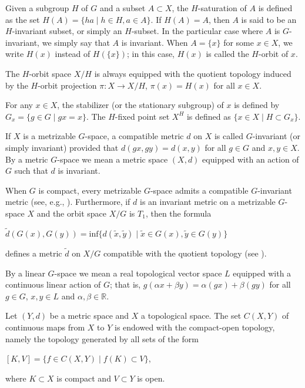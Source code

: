 \documentclass[12pt]{amsart}
\theoremstyle{definition}
\begin{document}
	Given a subgroup $H$ of $G$ and a subset $A\subset X$, the $H$-saturation of $A$ is defined as the set $H(A)= \{ha \mid h \in H, a \in A\}$. If $H(A)=A$, then $A$ is said to be an $H$-invariant subset, or simply an $H$-subset. In the particular case where $A$ is $G$-invariant, we simply say that $A$ is invariant. When $A=\{x\}$ for some $x\in X$, we write $H(x)$ instead of $H(\{x\})$; in this case, $H(x)$ is called the $H$-orbit of $x$.
	
	The $H$-orbit space $X/H$ is always equipped with the quotient topology induced by the $H$-orbit projection  $\pi: X\rightarrow X/H$, $\pi (x)=H(x)$ for all $x\in X$.
	
	For any $x\in X$, the stabilizer (or the stationary subgroup) of $x$ is defined by  $G_x=\{g\in G \mid  gx =x\}$. The $H$-fixed point set $X^H$ is defined as $\{x \in X \mid H\subset G_x\}$.
	
	If $X$ is a metrizable $G$-space, a compatible metric $d$ on  $X$ is called $G$-invariant (or simply invariant) provided that $d(gx, gy) =d(x, y)$ for all $g\in G$ and $x, y \in X$. By a metric $G$-space we mean a metric space $(X,d)$ equipped with an action of $G$ such that $d$ is invariant.
	
	When $G$ is compact, every metrizable $G$-space admits a compatible $G$-invariant metric (see, e.g., \cite[Proposition 1.1.12]{RP}). Furthermore, if $d$ is an invariant metric on a metrizable $G$-space $X$ and the orbit space $X/G$ is $T_1$, then the formula 
	\begin{center}
		$\widetilde{d}(G(x), G(y)) = \mbox{inf} \{d(\tilde{x},\tilde{y}) \mid \tilde{x} \in G(x), \tilde{y}\in G(y)\}$
	\end{center}
	defines a metric $\widetilde{d}$ on $X/G$ compatible with the quotient topology (see \cite[Proposition 1.1.12]{RP}). 
	
	By a linear $G$-space we mean a real topological vector space $L$ equipped with a continuous linear action of $G$; that is, $ g(\alpha x + \beta y) =\alpha(gx) +\beta(gy)$ for all $g\in G$, $x, y \in L$ and $\alpha, \beta \in \mathbb{R}$.
	
	Let $(Y,d)$ be a metric space and $X$ a topological space. The set $C(X, Y)$ of continuous maps from $X$ to $Y$ is endowed with the compact-open topology, namely the topology generated by all sets of the form
	
	\begin{center}
		$[K,V]=\{f\in C(X,Y)\mid f(K)\subset V\}$,
	\end{center}
	where $K\subset X$ is compact and $V\subset Y$ is open.
	
\end{document}
